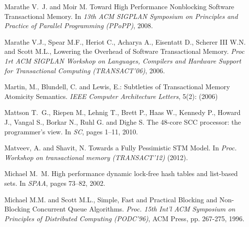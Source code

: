 \begin{thebibliography}{99}
{
Marathe V.~J. and Moir M.
Toward High Performance Nonblocking Software Transactional Memory. 
In {\em 13th ACM SIGPLAN Symposium on Principles and Practice of Parallel Programming (PPoPP)}, 2008.


Marathe  V.J.,  Spear M.F., Heriot  C., Acharya A., Eisentatt  D., Scherer
III W.N. and Scott M.L.,
Lowering the Overhead of Software Transactional Memory. 
{\it  Proc 1rt  ACM SIGPLAN  Workshop on  Languages, Compilers  and Hardware
Support for Transactional Computing (TRANSACT'06)}, 2006. 





 Martin, M.,  Blundell, C. and Lewis, E.:
 Subtleties of Transactional Memory Atomicity Semantics. 
{\it IEEE Computer Architecture  Letters},  5(2):  (2006)



Mattson T.~G., Riepen M., Lehnig T., Brett P., Haas W., Kennedy P., Howard J.,
  Vangal S., Borkar N., Ruhl G. and Dighe S.
\newblock The 48-core {SCC} processor: the programmer's view.
\newblock In {\em SC}, pages 1--11, 2010.


Matveev, A. and  Shavit, N.
Towards a Fully Pessimistic STM Model. 
In {\it Proc. Workshop on transactional memory (TRANSACT'12)} (2012).



Michael M.~M.
\newblock High performance dynamic lock-free hash tables and list-based sets.
\newblock In {\em SPAA}, pages 73--82, 2002.





Michael M.M.  and Scott M.L., 
Simple, Fast and Practical Blocking and Non-Blocking Concurrent
Queue Algorithms.
{\it  Proc. 15th  Int'l  ACM Symposium on Principles of  Distributed 
Computing (PODC'96)},  ACM Press, pp. 267-275,  1996. 



}
\end{thebibliography}
